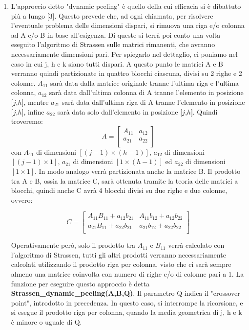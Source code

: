 \documentclass[10pt,a4paper,twoside]{tau-book}
\begin{document}
\begin{enumerate}
\item L'approccio detto "dynamic peeling" è quello della cui efficacia si è dibattuto più a lungo [3]. Questo prevede che, ad ogni chiamata, per risolvere l'eventuale problema delle dimensioni dispari, si rimuova una riga e/o colonna ad A e/o B in base all'esigenza. Di queste si terrà poi conto una volta eseguito l'algoritmo di Strassen sulle matrici rimanenti, che avranno necessariamente dimensioni pari. Per spiegarlo nel dettaglio, ci poniamo nel caso in cui j, h e k siano tutti dispari. A questo punto le matrici A e B verranno quindi partizionate in quattro blocchi ciascuna, divisi su 2 righe e 2 colonne. $A_{11}$ sarà data dalla matrice originale tranne l'ultima riga e l'ultima colonna, $a_{12}$ sarà data dall'ultima colonna di A tranne l'elemento in posizione $[j$,$h]$, mentre $a_{21}$ sarà data dall'ultima riga di A tranne l'elemento in posizione $[j$,$h]$, infine $a_{22}$ sarà data solo dall'elemento in posizione $[j$,$h]$. Quindi troveremo:
\begin{equation}
A = \left[ \begin{array}{c|c}
A_{11} & a_{12} \\ \hline
a_{21} & a_{22} \\ \end{array} \right]
\end{equation}
con $A_{11}$ di dimensioni $[(j-1) \times (h-1)]$, $a_{12}$ di dimensioni $[(j-1)\times 1]$, $a_{21}$ di dimensioni $[1 \times (h-1)]$ ed $a_{22}$ di dimensioni $[1\times 1]$. In modo analogo verrà partizionata anche la matrice B. Il prodotto tra A e B, ossia la matrice C, sarà ottenuta tramite la teoria delle matrici a blocchi, quindi anche C avrà 4 blocchi divisi su due righe e due colonne, ovvero:
    
\begin{equation}
C = \left[ \begin{array}{c|c}
A_{11}B_{11}+a_{12}b_{21} & A_{11}b_{12}+a_{12}b_{22} \\ \hline
a_{21}B_{11}+a_{22}b_{21} & a_{21}b_{12}+a_{22}b_{22} \\
\end{array} \right]
\end{equation}
    
Operativamente però, solo il prodotto tra $A_{11}$ e $B_{11}$ verrà calcolato con l'algoritmo di Strassen, tutti gli altri prodotti verranno necessariamente calcolati utilizzando il prodotto riga per colonna, visto che ci sarà sempre almeno una matrice coinvolta con numero di righe e/o di colonne pari a 1. La funzione per eseguire questo approccio è detta \textbf{Strassen\_dynamic\_peeling(A,B,Q)}. Il parametro Q indica il "crossover point", introdotto in precedenza. In questo caso, si interrompe la ricorsione, e si esegue il prodotto riga per colonna, quando la media geometrica di j, h e k è minore o uguale di Q.

\end{enumerate}
\end{document}
